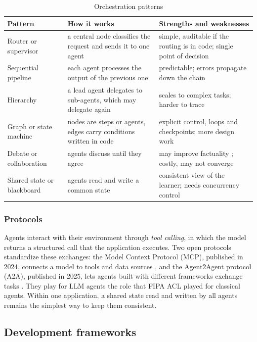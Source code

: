 \begin{table}[htbp]
\centering
\caption{Orchestration patterns}
\label{tab-orchestration}
\small
\begin{tabularx}{\textwidth}{@{}L{2.5cm}YY@{}}
\toprule
\textbf{Pattern} & \textbf{How it works} & \textbf{Strengths and weaknesses} \\
\midrule
Router or supervisor & a central node classifies the request and sends it to one agent & simple, auditable if the routing is in code; single point of decision \\
Sequential pipeline & each agent processes the output of the previous one & predictable; errors propagate down the chain \\
Hierarchy & a lead agent delegates to sub-agents, which may delegate again & scales to complex tasks; harder to trace \\
Graph or state machine & nodes are steps or agents, edges carry conditions written in code & explicit control, loops and checkpoints; more design work \\
Debate or collaboration & agents discuss until they agree & may improve factuality \cite{du2024debate}; costly, may not converge \\
Shared state or blackboard & agents read and write a common state \cite{nii1986} & consistent view of the learner; needs concurrency control \\
\bottomrule
\end{tabularx}
\end{table}

\subsubsection{Protocols}
Agents interact with their environment through
\emph{tool calling}, in which the model returns a structured call that the
application executes. Two open protocols standardize these exchanges: the
Model Context Protocol (MCP), published in 2024, connects a model to tools
and data sources \cite{mcp2024}, and the Agent2Agent protocol (A2A),
published in 2025, lets agents built with different frameworks exchange
tasks \cite{a2a2025}. They play for LLM agents the role that FIPA ACL
played for classical agents. Within one application, a shared state read
and written by all agents remains the simplest way to keep them consistent.

\subsection{Development frameworks}
\label{subsec-frameworks}

